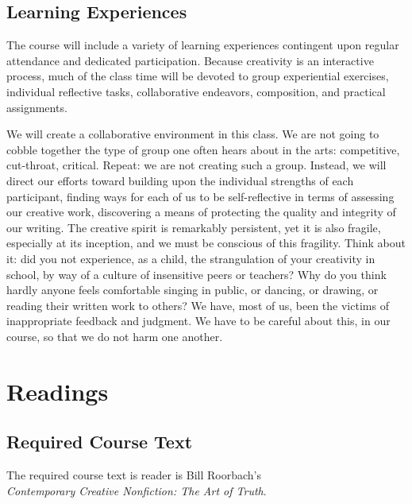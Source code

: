 \documentclass[letterpaper,10pt,headsepline]{scrreprt}
\begin{document}
\subsection{Learning Experiences}
The course will include a variety of learning experiences contingent
upon regular attendance and dedicated participation. Because
creativity is an interactive process, much of the class time will be
devoted to group experiential exercises, individual reflective tasks,
collaborative endeavors, composition, and practical assignments.

We will create a collaborative environment in this class. We are not
going to cobble together the type of group one often hears about in
the arts: competitive, cut-throat, critical. Repeat: we are not
creating such a group. Instead, we will direct our efforts toward
building upon the individual strengths of each participant, finding
ways for each of us to be self-reflective in terms of assessing our
creative work, discovering a means of protecting the quality and
integrity of our writing. The creative spirit is remarkably
persistent, yet it is also fragile, especially at its inception, and
we must be conscious of this fragility. Think about it: did you not
experience, as a child, the strangulation of your creativity in
school, by way of a culture of insensitive peers or teachers? Why do
you think hardly anyone feels comfortable singing in public, or
dancing, or drawing, or reading their written work to others? We have,
most of us, been the victims of inappropriate feedback and judgment.
We have to be careful about this, in our course, so that we do not
harm one another.

\section{Readings}
\subsection{Required Course Text}
The required course text is reader is Bill Roorbach's \\
\textit{Contemporary Creative Nonfiction: The Art of Truth}.
\end{document}
